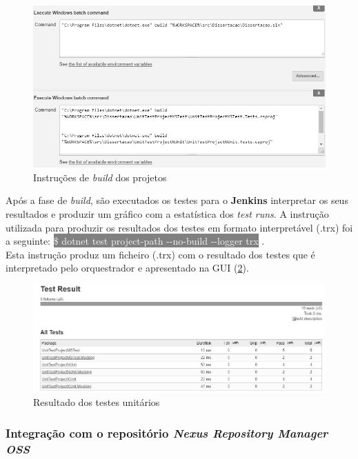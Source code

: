 \begin{figure}[hbt!]
\centering
\includegraphics[width=0.9\linewidth]{Cap5/JenkinsProjectBuild.png}
\caption{Instruções de \textit{build} dos projetos}
\label{Fig:Fig38}
\end{figure}

\hspace{1cm}Após a fase de \textit{build}, são executados os testes para o \textbf{Jenkins} interpretar os seus resultados e produzir um gráfico com a estatística dos \textit{test runs}. A instrução utilizada para produzir os resultados dos testes em formato interpretável (.trx) foi a seguinte: \colorbox{gray}{\textcolor{white}{\$ dotnet test project-path -{}-no-build -{}-logger trx}} \cite{dotnettest}.\\ Esta instrução produz um ficheiro (.trx) com o resultado dos testes que é interpretado pelo orquestrador e apresentado na GUI (\ref{Fig:Fig39}). 

\begin{figure}[hbt!]
\centering
\includegraphics[width=0.9\linewidth]{Cap5/JenkinsTestResult.png}
\caption{Resultado dos testes unitários}
\label{Fig:Fig39}
\end{figure}

\subsubsection{Integração com o repositório \textit{Nexus Repository Manager OSS}}

